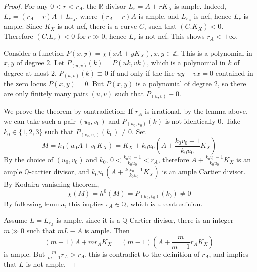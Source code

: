 \documentclass{article}
\begin{document}
\begin{proof}
  For any $ 0<r<r_A $, the $ \mathbb{R} $-divisor $ L_r=A+rK_X $ is ample. Indeed, $ L_r=(r_A-r)A+L_{r_A} $, where $ (r_A-r)A $ is ample, and $ L_{r_A} $ is nef, hence $ L_r $ is ample. Since $ K_X $ is not nef, there is a curve $ C $, such that $ (C.K_X)<0 $. Therefore  $ (C.L_r)<0 $ for $ r\gg 0 $, hence $ L_r $ is not nef. This shows $ r_A<+\infty $.

  Consider a function $ P(x,y)=\chi (xA+yK_X), x,y\in \mathbb{Z} $. This is a polynomial in $ x,y $ of degree $ 2 $. Let $ P_{(u,v)}(k)=P(uk,vk) $, which is a polynomial in $ k $ of degree at most $ 2 $. $ P_{(u,v)}(k)\equiv0 $ if and only if the line $ uy-vx=0 $ contained in the zero locus $ P(x,y)=0 $. But $ P(x,y) $ is a polynomial of degree $ 2 $, so there are only finitely many pairs $ (u,v) $ such that $ P_{(u,v)}\equiv 0 $.

  We prove the theorem by oantradiction: If $ r_A $ is irrational, by the lemma above, we can take such a pair $ (u_0,v_0) $ and $ P_{(u_0,v_0)}(k) $ is not identically $ 0 $. Take $ k_0\in \{1,2,3\} $ such that $ P_{(u_0,v_0)}(k_0)\neq 0  $. Set
  \[ M=k_0(u_0A+v_0K_X)=K_X+k_0u_0(A+\frac{k_0v_0-1}{k_0u_0}K_X) \]
  By the choice of $ (u_0,v_0) $ and $ k_0 $, $ 0<\frac{k_0v_0-1}{k_0u_0}<r_A $, therefore $ A+\frac{k_0v_0-1}{k_0u_0}K_X $ is an ample $ \mathbb{Q} $-cartier divisor, and $ k_0u_0(A+\frac{k_0v_0-1}{k_0u_0}K_X)  $ is an ample Cartier divisor. By Kodaira vanishing theorem,
  \[\chi(M)=h^0(M)=P_{(u_0,v_0)}(k_0)\neq 0 \]
  By following lemma, this implies $ r_A\in \mathbb{Q} $, which is a contradicion.

  Assume $ L=L_{r_A} $ is ample, since it is a $ \mathbb{Q} $-Cartier divisor, there is  an integer $ m\gg0 $ such that $ mL-A $ is ample. Then
  \[ (m-1)A+mr_AK_X=(m-1)(A+\frac{m}{m-1}r_AK_X) \]
  is ample. But $ \frac{m}{m-1}r_A>r_A $, this is contradict to the definition of $ r_A $, and implies that $ L $ is not ample.
\end{proof}
\end{document}
